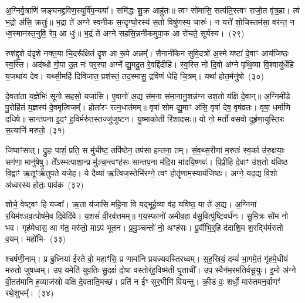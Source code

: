 {\anuvakamend[{अ॒स्य॒ङ्कु॒पञ्छन्द॒स्त्रय॑स्त्रिꣳशच्च}]}%

अ॒ग्निर्वृ॒त्राणि॑ जङ्घनद्द्रविण॒स्युर्वि॑प॒न्यया᳚। समि॑द्धः शु॒क्र आहु॑तः॥ त्वꣳ सो॑मासि॒ सत्प॑ति॒स्त्वꣳ राजो॒त वृ॑त्र॒हा। त्वं भ॒द्रो अ॑सि॒ क्रतुः॑॥ भ॒द्रा ते॑ अग्ने स्वनीक स॒न्दृग्घो॒रस्य॑ स॒तो विषु॑णस्य॒ चारुः॑। न यत्ते॑ शो॒चिस्तम॑सा॒ वर॑न्त॒ न ध्व॒स्मान॑स्त॒नुवि॒ रेप॒ आ धुः॑॥ भ॒द्रं ते॑ अग्ने सहसि॒न्ननी॑कमुपा॒क आ रो॑चते॒ सूर्य॑स्य।~(२९)\ip

रुश॑द्दृ॒शे द॑दृशे नक्त॒या चि॒दरू᳚क्षितं दृ॒श आ रू॒पे अन्नम्᳚। सैनानी॑केन सुवि॒दत्रो॑ अ॒स्मे यष्टा॑ दे॒वाꣳ आय॑जिष्ठः स्व॒स्ति। अद॑ब्धो गो॒पा उ॒त नः॑ पर॒स्पा अग्ने᳚ द्यु॒मदु॒त रे॒वद्दि॑दीहि। स्व॒स्ति नो॑ दि॒वो अ॑ग्ने पृथि॒व्या वि॒श्वायु॑र्धेहि य॒जथा॑य देव। यथ्सी॒महि॑ दिविजात॒ प्रश॑स्तं॒ तद॒स्मासु॒ द्रवि॑णं धेहि चि॒त्रम्। यथा॑ होत॒र्मनु॑षो~(३०)\ip

दे॒वता॑ता य॒ज्ञेभिः॑ सूनो सहसो॒ यजा॑सि। ए॒वानो॑ अ॒द्य स॑म॒ना स॑मा॒नानु॒शन्न॑ग्न उश॒तो य॑क्षि दे॒वान्॥ अ॒ग्निमी॑डे पु॒रोहि॑तं य॒ज्ञस्य॑ दे॒वमृ॒त्विजम्᳚। होता॑रꣳ रत्न॒धात॑मम्॥ वृषा॑ सोम द्यु॒माꣳ अ॑सि॒ वृषा॑ देव॒ वृष॑व्रतः। वृषा॒ धर्मा॑णि दधिषे॥ सान्त॑पना इ॒दꣳ ह॒विर्मरु॑त॒स्तज्जु॑जुष्टन। यु॒ष्माको॒ती रि॑शादसः॥ यो नो॒ मर्तो॑ वसवो दुर्\mbox{}हृणा॒युस्ति॒रः स॒त्यानि॑ मरुतो॒~(३१)\ip

जिघाꣳ॑सात्। द्रु॒हः पाशं॒ प्रति॒ स मु॑चीष्ट॒ तपि॑ष्ठेन॒ तप॑सा हन्तना॒ तम्। सं॒व॒थ्स॒रीणा॑ म॒रुतः॑ स्व॒र्का उ॑रु॒क्षयाः॒ सग॑णा॒ मानु॑षेषु। ते᳚\-ऽस्मत्पाशा॒न्प्र मु॑ञ्च॒न्त्वꣳह॑सः सान्तप॒ना म॑दि॒रा मा॑दयि॒ष्णवः॑। पि॒प्री॒हि दे॒वाꣳ उ॑श॒तो य॑विष्ठ वि॒द्वाꣳ ऋ॒तूꣳर्\mbox{}ऋ॑तुपते यजे॒ह। ये दैव्या॑ ऋ॒त्विज॒स्तेभि॑रग्ने॒ त्वꣳ होतॄ॑णाम॒स्याय॑जिष्ठः। अग्ने॒ यद॒द्य वि॒शो अ॑ध्वरस्य होतः॒ पाव॑क~(३२)\ip

शोचे॒ वेष्ट्वꣳ हि यज्वा᳚। ऋ॒ता य॑जासि महि॒ना वि यद्भूर्\mbox{}ह॒व्या व॑ह यविष्ठ॒ या ते॑ अ॒द्य। अ॒ग्निना॑ र॒यिम॑श्ञव॒त्पोष॑मे॒व दि॒वेदि॑वे। य॒शसं॑ वी॒रव॑त्तमम्॥ ग॒य॒स्फानो॑ अमीव॒हा व॑सु॒वित्पु॑ष्टि॒वर्ध॑नः। सु॒मि॒त्रः सो॑म नो भव। गृह॑मेधास॒ आ ग॑त॒ मरु॑तो॒ माऽप॑ भूतन। प्र॒मु॒ञ्चन्तो॑ नो॒ अꣳह॑सः। पू॒र्वीभि॒र्॒\mbox{}हि द॑दाशि॒म श॒रद्भि॑र्मरुतो व॒यम्। महो॑भि-~(३३)\ip

श्चर्\mbox{}षणी॒नाम्। प्र बु॒ध्निया॑ ईरते वो॒ महाꣳ॑सि॒ प्र णामा॑नि प्रयज्यवस्तिरध्वम्। स॒ह॒स्रियं॒ दम्यं॑ भा॒गमे॒तं गृ॑हमे॒धीयं॑ मरुतो जुषध्वम्। उप॒ यमेति॑ युव॒तिः सु॒दक्षं॑ दो॒षा वस्तोर्॑\mbox{}ह॒विष्म॑ती घृ॒ताची᳚। उप॒ स्वैन॑म॒रम॑तिर्वसू॒युः। इ॒मो अ॑ग्ने वी॒तत॑मानि ह॒व्याज॑स्रो वक्षि दे॒वता॑ति॒मच्छ॑। प्रति॑ न ईꣳ सुर॒भीणि॑ वियन्तु। क्री॒डं वः॒ शर्धो॒ मारु॑तमन॒र्वाणꣳ॑ रथे॒शुभम्᳚।~(३४)\ip

